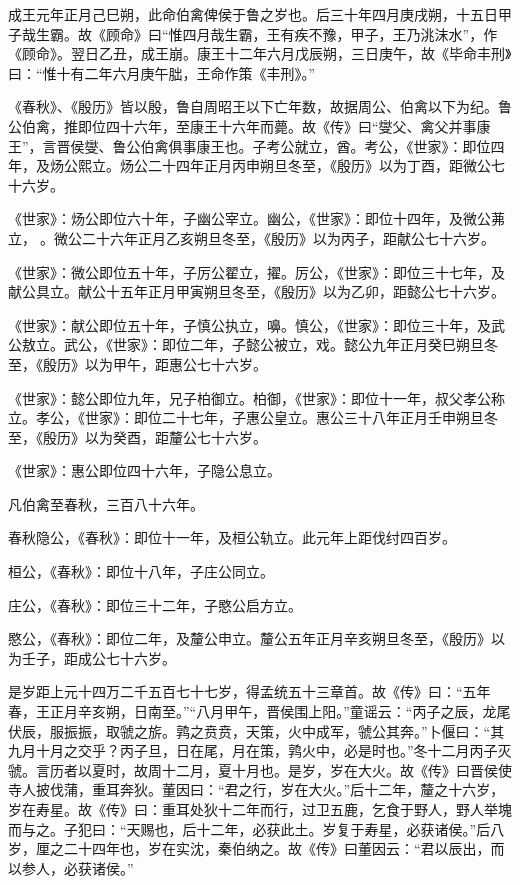 \documentclass[12pt,UTF8]{ctexbook}
\begin{document}
成王元年正月己巳朔，此命伯禽俾侯于鲁之岁也。后三十年四月庚戌朔，十五日甲子哉生霸。故《顾命》曰“惟四月哉生霸，王有疾不豫，甲子，王乃洮沫水”，作《顾命》。翌日乙丑，成王崩。康王十二年六月戊辰朔，三日庚午，故《毕命丰刑》曰：“惟十有二年六月庚午朏，王命作策《丰刑》。”



《春秋》、《殷历》皆以殷，鲁自周昭王以下亡年数，故据周公、伯禽以下为纪。鲁公伯禽，推即位四十六年，至康王十六年而薨。故《传》曰“燮父、禽父并事康王”，言晋侯燮、鲁公伯禽俱事康王也。子考公就立，酋。考公，《世家》：即位四年，及炀公熙立。炀公二十四年正月丙申朔旦冬至，《殷历》以为丁酉，距微公七十六岁。



《世家》：炀公即位六十年，子幽公宰立。幽公，《世家》：即位十四年，及微公茀立，。微公二十六年正月乙亥朔旦冬至，《殷历》以为丙子，距献公七十六岁。



《世家》：微公即位五十年，子厉公翟立，擢。厉公，《世家》：即位三十七年，及献公具立。献公十五年正月甲寅朔旦冬至，《殷历》以为乙卯，距懿公七十六岁。



《世家》：献公即位五十年，子慎公执立，嚊。慎公，《世家》：即位三十年，及武公敖立。武公，《世家》：即位二年，子懿公被立，戏。懿公九年正月癸巳朔旦冬至，《殷历》以为甲午，距惠公七十六岁。



《世家》：懿公即位九年，兄子柏御立。柏御，《世家》：即位十一年，叔父孝公称立。孝公，《世家》：即位二十七年，子惠公皇立。惠公三十八年正月壬申朔旦冬至，《殷历》以为癸酉，距釐公七十六岁。



《世家》：惠公即位四十六年，子隐公息立。



凡伯禽至春秋，三百八十六年。



春秋隐公，《春秋》：即位十一年，及桓公轨立。此元年上距伐纣四百岁。



桓公，《春秋》：即位十八年，子庄公同立。



庄公，《春秋》：即位三十二年，子愍公启方立。



愍公，《春秋》：即位二年，及釐公申立。釐公五年正月辛亥朔旦冬至，《殷历》以为壬子，距成公七十六岁。



是岁距上元十四万二千五百七十七岁，得孟统五十三章首。故《传》曰：“五年春，王正月辛亥朔，日南至。”“八月甲午，晋侯围上阳。”童谣云：“丙子之辰，龙尾伏辰，服振振，取虢之旂。鹑之贲贲，天策，火中成军，虢公其奔。”卜偃曰：“其九月十月之交乎？丙子旦，日在尾，月在策，鹑火中，必是时也。”冬十二月丙子灭虢。言历者以夏时，故周十二月，夏十月也。是岁，岁在大火。故《传》曰晋侯使寺人披伐蒲，重耳奔狄。董因曰：“君之行，岁在大火。”后十二年，釐之十六岁，岁在寿星。故《传》曰：重耳处狄十二年而行，过卫五鹿，乞食于野人，野人举塊而与之。子犯曰：“天赐也，后十二年，必获此土。岁复于寿星，必获诸侯。”后八岁，厘之二十四年也，岁在实沈，秦伯纳之。故《传》曰董因云：“君以辰出，而以参人，必获诸侯。”
\end{document}
